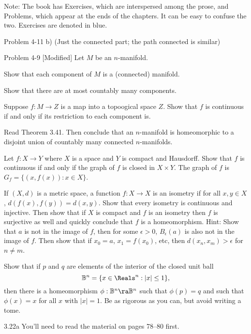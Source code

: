 \documentclass[minion]{homework651}
\begin{document}
Note: The book has Exercises, which are interspersed among the
prose, and Problems, which appear at the ends of the chapters.
It can be easy to confuse the two.  Exercises are denoted in blue.


\begin{problems}

\problem Problem 4-11 b) (Just the connected part; the path connected is similar)

\problem Problem 4-9 [Modified]
Let $M$ be an $n$-manifold.
\begin{subproblems}
\item Show that each component of $M$ is a (connected) manifold.
\item Show that there are at most countably many components.
\item Suppose $f:M\to Z$ is a map into a topoogical space $Z$. Show
that $f$ is continuous if and only if its restriction to each component is.
\item Read Theorem 3.41.  Then conclude that an $n$-manifold is homeomorphic
to a disjoint union of countably many connected $n$-manifolds.
\end{subproblems}

\problem Let $f:X\rightarrow Y$ where $X$ is a space and $Y$ is compact and Hausdorff.  Show that
$f$ is continuous if and only if the graph of $f$ is closed in $X\times Y$.  The graph
of $f$ is $G_f=\{(x,f(x)):x\in X\}$.

\problem If $(X,d)$ is a metric space, a function $f:X\rightarrow X$ is an isometry if
for all $x,y\in X$, $d(f(x),f(y))=d(x,y)$.  Show that every isometry is continuous and injective.
Then show that if  $X$ is compact and $f$ is an isometry 
then $f$ is surjective  as well and quickly conclude that $f$ is a homeomorphism. Hint:
Show that $a$ is not in the image of $f$, then for some $\epsilon>0$, $B_\epsilon(a)$
is also not in the image of $f$.  Then show that if $x_0=a$, $x_1=f(x_0)$, etc, then 
$d(x_n,x_m)>\epsilon$ for $n\neq m$.

\problem Show that if $p$ and $q$ are elements of the interior of the closed unit ball 
$$
\mathbb B^n=\{x\in \Reals^n:|x|\le 1\},
$$
then there is a homeomorphism $\phi:\mathbb B^n\ra \mathbb B^n$ such that $\phi(p)=q$ and such that $\phi(x)=x$ for all $x$
with $|x|=1$.  Be as rigorous as you can, but avoid writing a tome.

\problem 3.22a You'll need to read the material on pages 78--80 first.

\end{problems}
\end{document}
